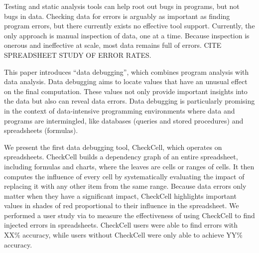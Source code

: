 Testing and static analysis tools can help root out bugs in programs,
but not bugs in data. Checking data for errors is arguably as
important as finding program errors, but there currently exists no
effective tool support. Currently, the only approach is manual
inspection of data, one at a time. Because inspection is onerous and
ineffective at scale, most data remains full of errors. CITE
SPREADSHEET STUDY OF ERROR RATES.

This paper introduces ``data debugging'', which combines program
analysis with data analysis. Data debugging aims to locate values that
have an unusual effect on the final computation.  These values not
only provide important insights into the data but also can reveal data
errors.  Data debugging is particularly promising in the context of
data-intensive programming environments where data and programs are
intermingled, like databases (queries and stored procedures) and
spreadsheets (formulas).

We present the first data debugging tool, CheckCell, which operates on
spreadsheets. CheckCell builds a dependency graph of an entire
spreadsheet, including formulas and charts, where the leaves are cells
or ranges of cells. It then computes the influence of every cell by
systematically evaluating the impact of replacing it with any other
item from the same range. Because data errors only matter when they
have a significant impact, CheckCell highlights important values in
shades of red proportional to their influence in the spreadsheet.  We
performed a user study via to measure the effectiveness of using
CheckCell to find injected errors in spreadsheets. CheckCell users
were able to find errors with XX\% accuracy, while users without
CheckCell were only able to achieve YY\% accuracy.
